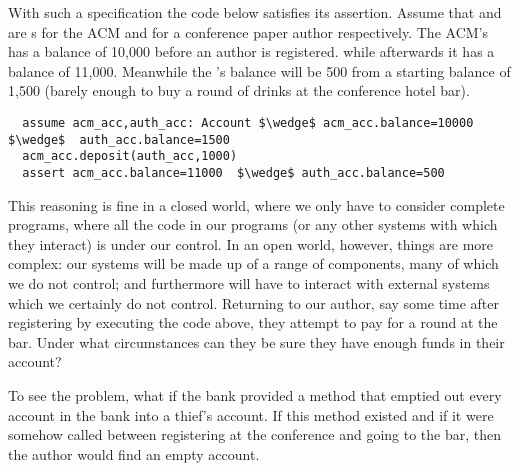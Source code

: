 
With such a specification %
the code below  satisfies its assertion. Assume that 
 and  are s for the ACM and
for a conference paper author respectively. The ACM's 
has a balance of 10,000 before an author is 
registered. while afterwards it has a balance of 11,000. Meanwhile the
's balance  will be 500 from a starting balance of 1,500
(barely enough to buy a round of drinks at the conference hotel bar).

\begin{lstlisting}
  assume acm_acc,auth_acc: Account $\wedge$ acm_acc.balance=10000 $\wedge$  auth_acc.balance=1500
  acm_acc.deposit(auth_acc,1000)
  assert acm_acc.balance=11000  $\wedge$ auth_acc.balance=500
\end{lstlisting}

\vspace{-.2in}

This reasoning is fine in a closed world, where we only have to
consider complete programs, where all the code in our programs (or any
other systems with which they interact) is under our control.   
In an
open world, however, things are more complex: our systems will be made
up of a range of 
components, many of which we do not control; and
furthermore will have to interact with external systems which we
certainly do not control.  Returning to our author, say some time
after registering by executing the  code above, they
attempt to pay for a round at the bar.  Under what circumstances can
they be sure they have enough funds in their account?

To see the problem, what if the bank provided a  method that 
 emptied out every account in the bank into a thief's account.
If this method existed and
if it were somehow called between registering at the conference and
going to the bar, then the author 
would find an empty account.
%

